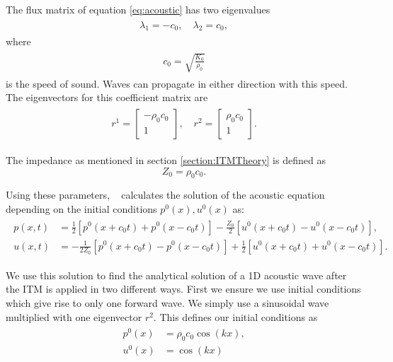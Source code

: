 The flux matrix of equation \ref{eq:acoustic} has two eigenvalues
\begin{align}
    \begin{split}
        \lambda_1 = -c_0, \quad \lambda_2 = c_0,
    \end{split}
\end{align}
where 
\begin{align}
    \begin{split}
        c_0 = \sqrt{\frac{K_0}{\rho_0}}
    \end{split}
\end{align}
is the speed of sound. Waves can propagate in either direction with this speed. The eigenvectors for this coefficient matrix are
\begin{align}
    \begin{split}
        r^1 = \begin{bmatrix}
            -\rho_0 c_0 \\
            1
        \end{bmatrix}, \quad
        r^2 = \begin{bmatrix}
            \rho_0 c_0 \\
            1
        \end{bmatrix}.
    \end{split}
\end{align}

The impedance as mentioned in section \ref{section:ITMTheory} is defined as
\begin{equation}
    Z_0 = \rho_0 c_0.
\end{equation}
\par Using these parameters, ~\parencite[Sec. 2.8]{leveque_2002} calculates the solution of the acoustic equation depending on the initial conditions $p^0(x), u^0(x)$ as:
\begin{align}
    \begin{split}
        p(x,t) &= \frac{1}{2}\left[p^0\left(x + c_0t\right) + p^0\left(x - c_0t\right)\right] - \frac{Z_0}{2}\left[u^0\left(x+c_0t\right) - u^0\left(x-c_0t\right)\right], \\
        u(x,t) &= -\frac{1}{2Z_0}\left[p^0\left(x+c_0t\right) - p^0\left(x-c_0t\right)\right] + \frac{1}{2}\left[u^0\left(x+c_0t\right) + u^0\left(x-c_0t\right)\right] .
    \end{split}
    \label{eq:solutionacoustic}
\end{align}

We use this solution to find the analytical solution of a 1D acoustic wave after the \ac{ITM} is applied in two different ways. First we ensure we use initial conditions which give rise to only one forward wave. We simply use a sinusoidal wave multiplied with one eigenvector $r^2$.
This defines our initial conditions as
\begin{align}
    \begin{split}
        p^0\left(x\right) &= \rho_0c_0 \cos\left(kx\right), \\
        u^0\left(x\right) &= \cos\left(kx\right)
    \end{split}
    \label{eq:initialconditions}
\end{align}

